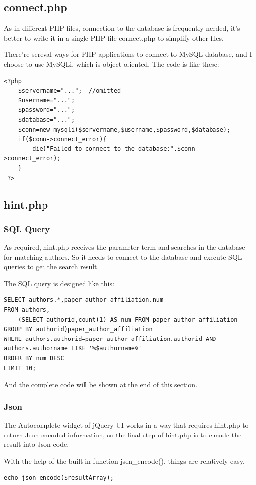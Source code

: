 \documentclass[a4paper]{article}
\begin{document}
        \subsection{connect.php}
As in different PHP files, connection to the database is frequently needed, it's better to write it in a single PHP file connect.php to simplify other files.

There're sereval ways for PHP applications to connect to MySQL database, and I choose to use MySQLi, which is object-oriented. The code is like these:
            \begin{verbatim}
<?php
    $servername="...";  //omitted
    $username="...";
    $password="...";
    $database="...";
    $conn=new mysqli($servername,$username,$password,$database);
    if($conn->connect_error){
        die("Failed to connect to the database:".$conn->connect_error);
    }
 ?>
            \end{verbatim}
        \subsection{hint.php}
            \subsubsection{SQL Query}
As required, hint.php receives the parameter term and searches in the database for matching authors. So it needs to connect to the database and execute SQL queries to get the search result.

The SQL query is designed like this:
                \begin{verbatim}
SELECT authors.*,paper_author_affiliation.num
FROM authors,
    (SELECT authorid,count(1) AS num FROM paper_author_affiliation GROUP BY authorid)paper_author_affiliation
WHERE authors.authorid=paper_author_affiliation.authorid AND authors.authorname LIKE '%$authorname%'
ORDER BY num DESC
LIMIT 10;
                \end{verbatim}
And the complete code will be shown at the end of this section.
            \subsubsection{Json}
The Autocomplete widget of jQuery UI works in a way that requires hint.php to return Json encoded information, so the final step of hint.php is to encode the result into Json code.

With the help of the built-in function json\_encode(), things are relatively easy.
                \begin{verbatim}
echo json_encode($resultArray);
                \end{verbatim}
\end{document}
